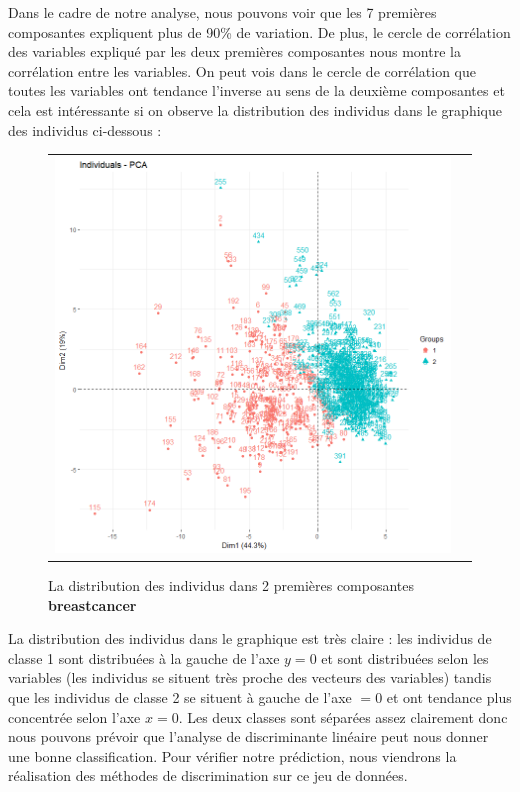 \documentclass[a4paper,11pt,oneside,roman]{article}
\begin{document}
Dans le cadre de notre analyse, nous pouvons voir que les 7 premières composantes expliquent plus de 90\% de variation. De plus, le cercle de corrélation des variables expliqué par les deux premières composantes nous montre la corrélation entre les variables. On peut vois dans le cercle de corrélation que toutes les variables ont tendance l'inverse au sens de la deuxième composantes et cela est intéressante si on observe la distribution des individus dans le graphique des individus ci-dessous : 
\begin{figure}[htb]
    \centering
    \begin{tabular}{cc}
    \includegraphics[scale = .4]{./discrimination/breastcancer/indi_plot12.png} &
    \end{tabular}
    \caption{La distribution des individus dans 2 premières composantes \textbf{breastcancer}}
    \label{fig:my_label}
\end{figure}
La distribution des individus dans le graphique est très claire : les individus de classe 1 sont distribuées à la gauche de l'axe $y=0$ et sont distribuées selon les variables (les individus se situent très proche des vecteurs des variables) tandis que les individus de classe 2 se situent à gauche de l'axe $=0$ et ont tendance plus concentrée selon l'axe $x=0$. Les deux classes sont séparées assez clairement donc nous pouvons prévoir que l'analyse de discriminante linéaire peut nous donner une bonne classification. Pour vérifier notre prédiction, nous viendrons la réalisation des méthodes de discrimination sur ce jeu de données.
\end{document}
